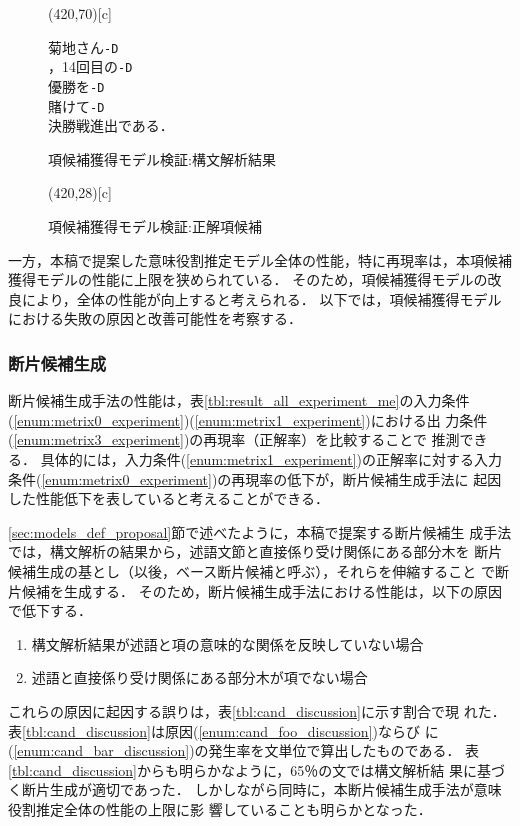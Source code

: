 \documentclass[japanese]{jnlp_1.2b}
\begin{document}
\begin{figure}[b]
\framebox(420,70)[c]{\parbox{90pt}{
	\hfill 菊地さん\texttt{-D}\hspace*{18.49986pt}\\
	\hfill ，14回目の\texttt{-D}\hspace*{12.33324pt}\\
	\hfill 優勝を\texttt{-D}\hspace*{6.16662pt}\\
	\hfill 賭けて\texttt{-D}\\
	\hfill 決勝戦進出である．
}}
 \caption{項候補獲得モデル検証:構文解析結果}
 \label{fig:syn_analyze_discussion0}
    \par\vspace{20pt}
\framebox(420,28)[c]{
 
	 
}
 \caption{項候補獲得モデル検証:正解項候補}
 \label{fig:candidating_discussion0}
\end{figure}

一方，本稿で提案した意味役割推定モデル全体の性能，特に再現率は，本項候補
獲得モデルの性能に上限を狭められている．
そのため，項候補獲得モデルの改良により，全体の性能が向上すると考えられる．
以下では，項候補獲得モデルにおける失敗の原因と改善可能性を考察する．




\subsubsection*{断片候補生成}

断片候補生成手法の性能は，表\ref{tbl:result_all_experiment_me}の入力条件
(\ref{enum:metrix0_experiment})(\ref{enum:metrix1_experiment})における出
力条件(\ref{enum:metrix3_experiment})の再現率（正解率）を比較することで
推測できる．
具体的には，入力条件(\ref{enum:metrix1_experiment})の正解率に対する入力
条件(\ref{enum:metrix0_experiment})の再現率の低下が，断片候補生成手法に
起因した性能低下を表していると考えることができる．


\ref{sec:models_def_proposal}節で述べたように，本稿で提案する断片候補生
成手法では，構文解析の結果から，述語文節と直接係り受け関係にある部分木を
断片候補生成の基とし（以後，ベース断片候補と呼ぶ），それらを伸縮すること
で断片候補を生成する．
そのため，断片候補生成手法における性能は，以下の原因で低下する．

\begin{enumerate}
 \item 構文解析結果が述語と項の意味的な関係を反映していない場合
       \label{enum:cand_foo_discussion}
 \item 述語と直接係り受け関係にある部分木が項でない場合
       \label{enum:cand_bar_discussion}
\end{enumerate}
これらの原因に起因する誤りは，表\ref{tbl:cand_discussion}に示す割合で現
れた．
表\ref{tbl:cand_discussion}は原因(\ref{enum:cand_foo_discussion})ならび
に(\ref{enum:cand_bar_discussion})の発生率を文単位で算出したものである．
表\ref{tbl:cand_discussion}からも明らかなように，65％の文では構文解析結
果に基づく断片生成が適切であった．
しかしながら同時に，本断片候補生成手法が意味役割推定全体の性能の上限に影
響していることも明らかとなった．
\end{document}
